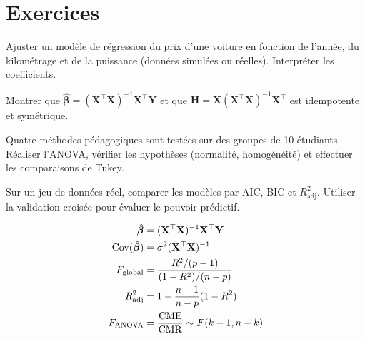 \section{Exercices}

\begin{exercice}
Ajuster un mod\`ele de r\'egression du prix d'une voiture en fonction de l'ann\'ee, du kilom\'etrage et de la puissance (donn\'ees simul\'ees ou r\'eelles). Interpr\'eter les coefficients.
\end{exercice}

\begin{exercice}
Montrer que $\hat{\bm{\beta}}=(\mathbf{X}^\top\mathbf{X})^{-1}\mathbf{X}^\top\mathbf{Y}$ et que $\mathbf{H}=\mathbf{X}(\mathbf{X}^\top\mathbf{X})^{-1}\mathbf{X}^\top$ est idempotente et sym\'etrique.
\end{exercice}

\begin{exercice}
Quatre m\'ethodes p\'edagogiques sont test\'ees sur des groupes de 10 \'etudiants. R\'ealiser l'ANOVA, v\'erifier les hypoth\`eses (normalit\'e, homog\'en\'eit\'e) et effectuer les comparaisons de Tukey.
\end{exercice}

\begin{exercice}
Sur un jeu de donn\'ees r\'eel, comparer les mod\`eles par AIC, BIC et $R^2_{\mathrm{adj}}$. Utiliser la validation crois\'ee pour \'evaluer le pouvoir pr\'edictif.
\end{exercice}

\begin{formules}
\begin{align*}
\hat{\bm{\beta}} &= (\mathbf{X}^\top\mathbf{X})^{-1}\mathbf{X}^\top\mathbf{Y} \\
\operatorname{Cov}(\hat{\bm{\beta}}) &= \sigma^2(\mathbf{X}^\top\mathbf{X})^{-1} \\
F_{\text{global}} &= \frac{R^2/(p-1)}{(1-R^2)/(n-p)} \\
R^2_{\mathrm{adj}} &= 1 - \frac{n-1}{n-p}(1-R^2) \\
F_{\text{ANOVA}} &= \frac{\mathrm{CME}}{\mathrm{CMR}} \sim F(k-1,n-k)
\end{align*}
\end{formules}
